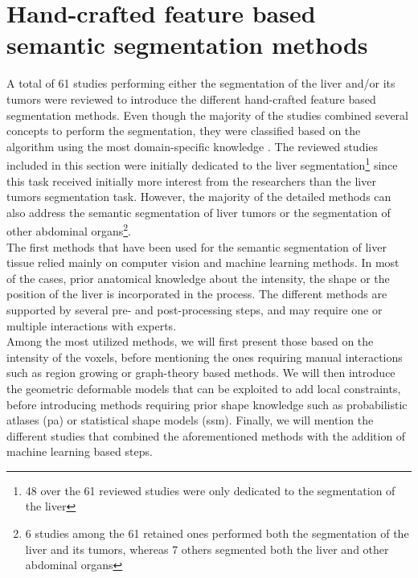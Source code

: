 \section{Hand-crafted feature based semantic segmentation methods}

A total of 61 studies performing either the segmentation of the liver and/or its tumors 
were reviewed to introduce the different hand-crafted feature based segmentation methods. 
Even though the majority of the studies 
 combined several concepts to perform the segmentation, they were classified 
 based on the algorithm using the most domain-specific knowledge \cite{Moghbel2018}.
The reviewed studies included in this section were initially dedicated
 to the liver segmentation\footnote{48 over the 61 reviewed studies were only dedicated to
 the segmentation of the liver} since this task received initially more interest from the researchers than the liver tumors segmentation task. However, 
 the majority of the detailed methods can also address the semantic 
 segmentation of liver tumors or the segmentation of other abdominal 
 organs\footnote{6 studies among the 61 retained ones performed both the 
 segmentation of the liver and its tumors, whereas 7 others segmented both the liver and other abdominal organs}. \\
The first methods that have been used for the semantic segmentation of
liver tissue relied mainly on computer vision and machine
learning methods. In most of the cases, prior anatomical knowledge about
the intensity, the shape or the position of the liver is incorporated in
the process. The different methods are supported by several pre- and
post-processing steps, and may require one or multiple interactions with
experts.\\
Among the most utilized methods, we will first present those based on
the intensity of the voxels, before mentioning the ones requiring manual
interactions such as region growing or graph-theory based methods. We will 
then introduce the geometric deformable models that can be exploited to add 
local constraints, before introducing methods 
requiring prior shape knowledge such as
probabilistic atlases (\ac{pa}) or statistical shape models (\ac{ssm}).
Finally, we will mention the different studies that combined the
aforementioned methods with the addition of machine learning based steps.

